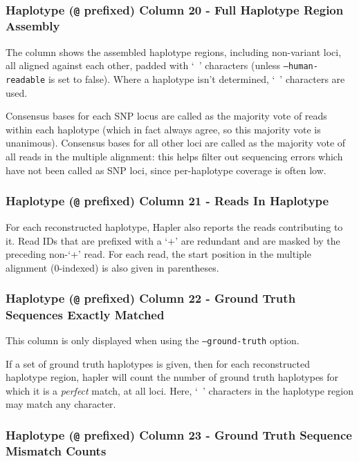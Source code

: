 \documentclass[11pt]{llncs}
\begin{document}

\subsubsection{Haplotype (\texttt{@} prefixed) Column 20 - Full Haplotype Region Assembly}

The column shows the assembled haplotype regions, including non-variant loci, all aligned against each other, padded with `~' characters (unless 
\texttt{--human-readable} is set to false). Where a haplotype isn't determined, `~' characters are used.

Consensus bases for each SNP locus are called as the majority vote of reads within each haplotype (which in fact always agree, so this 
majority vote is unanimous). Consensus bases for all other loci are called as the majority vote of all reads in the multiple alignment: this helps 
filter out sequencing errors which have not been called as SNP loci, since per-haplotype coverage is often low.

\subsubsection{Haplotype (\texttt{@} prefixed) Column 21 - Reads In Haplotype}

For each reconstructed haplotype, Hapler also reports the reads contributing to it. Read IDs that are prefixed with a `+' are redundant
and are masked by the preceding non-`+' read. For each read, the start position in the multiple alignment (0-indexed) is also given in 
parentheses. 

\subsubsection{Haplotype (\texttt{@} prefixed) Column 22 - Ground Truth Sequences Exactly Matched}

This column is only displayed when using the \texttt{--ground-truth} option.

If a set of ground truth haplotypes is given, then for each reconstructed haplotype region, hapler will count the number of ground truth haplotypes
for which it is a \emph{perfect} match, at all loci. Here, `~' characters in the haplotype region may match any character.

\subsubsection{Haplotype (\texttt{@} prefixed) Column 23 - Ground Truth Sequence Mismatch Counts}
\end{document}
